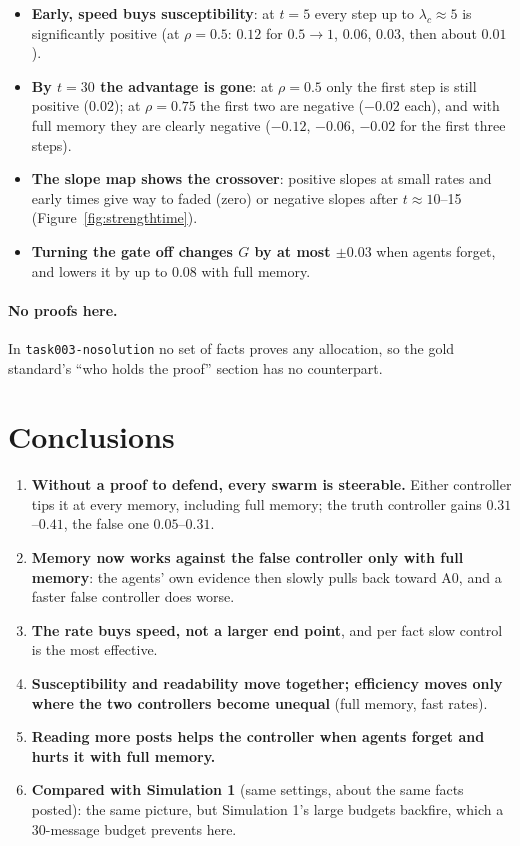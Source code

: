 \documentclass[10pt,a4paper]{article}
\begin{document}
\begin{itemize}\itemsep1pt
\item \textbf{Early, speed buys susceptibility}: at $t = 5$ every step up to $\lambda_c \approx 5$ is significantly
  positive (at $\rho = 0.5$: $0.12$ for $0.5 \to 1$, $0.06$, $0.03$, then about $0.01$).
\item \textbf{By $t = 30$ the advantage is gone}: at $\rho = 0.5$ only the first step is still positive ($0.02$); at
  $\rho = 0.75$ the first two are negative ($-0.02$ each), and with full memory they are clearly negative
  ($-0.12$, $-0.06$, $-0.02$ for the first three steps).
\item \textbf{The slope map shows the crossover}: positive slopes at small rates and early times give way to faded
  (zero) or negative slopes after $t \approx 10$--15 (Figure~\ref{fig:strengthtime}).
\item \textbf{Turning the gate off changes $G$ by at most $\pm0.03$} when agents forget, and lowers it by up to $0.08$
  with full memory.
\end{itemize}

\paragraph{No proofs here.} In \texttt{task003-nosolution} no set of facts proves any allocation, so the
gold standard's ``who holds the proof'' section has no counterpart.

\section{Conclusions}

\begin{enumerate}\itemsep2pt
\item \textbf{Without a proof to defend, every swarm is steerable.} Either controller tips it at every memory,
  including full memory; the truth controller gains $0.31$--$0.41$, the false one $0.05$--$0.31$.
\item \textbf{Memory now works against the false controller only with full memory}: the agents' own evidence then
  slowly pulls back toward A0, and a faster false controller does worse.
\item \textbf{The rate buys speed, not a larger end point}, and per fact slow control is the most effective.
\item \textbf{Susceptibility and readability move together; efficiency moves only where the two controllers become
  unequal} (full memory, fast rates).
\item \textbf{Reading more posts helps the controller when agents forget and hurts it with full memory.}
\item \textbf{Compared with Simulation 1} (same settings, about the same facts posted): the same picture, but Simulation 1's
  large budgets backfire, which a 30-message budget prevents here.
\end{enumerate}
\end{document}
